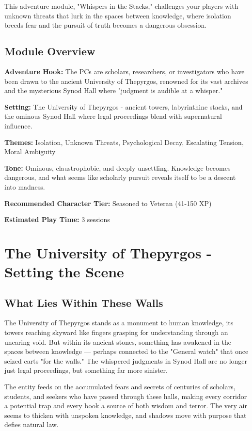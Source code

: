\documentclass[11pt]{article}
\begin{document}
This adventure module, "Whispers in the Stacks," challenges your players with unknown threats that lurk in the spaces between knowledge, where isolation breeds fear and the pursuit of truth becomes a dangerous obsession.

\subsection{Module Overview}

\textbf{Adventure Hook:} The PCs are scholars, researchers, or investigators who have been drawn to the ancient University of Thepyrgos, renowned for its vast archives and the mysterious Synod Hall where "judgment is audible at a whisper."

\textbf{Setting:} The University of Thepyrgos - ancient towers, labyrinthine stacks, and the ominous Synod Hall where legal proceedings blend with supernatural influence.

\textbf{Themes:} Isolation, Unknown Threats, Psychological Decay, Escalating Tension, Moral Ambiguity

\textbf{Tone:} Ominous, claustrophobic, and deeply unsettling. Knowledge becomes dangerous, and what seems like scholarly pursuit reveals itself to be a descent into madness.

\textbf{Recommended Character Tier:} Seasoned to Veteran (41-150 XP)

\textbf{Estimated Play Time:} 3 sessions

\section{The University of Thepyrgos - Setting the Scene}

\subsection{What Lies Within These Walls}

The University of Thepyrgos stands as a monument to human knowledge, its towers reaching skyward like fingers grasping for understanding through an uncaring void. But within its ancient stones, something has awakened in the spaces between knowledge — perhaps connected to the "General watch" that once seized carts "for the walls." The whispered judgments in Synod Hall are no longer just legal proceedings, but something far more sinister.

The entity feeds on the accumulated fears and secrets of centuries of scholars, students, and seekers who have passed through these halls, making every corridor a potential trap and every book a source of both wisdom and terror. The very air seems to thicken with unspoken knowledge, and shadows move with purpose that defies natural law.
\end{document}
